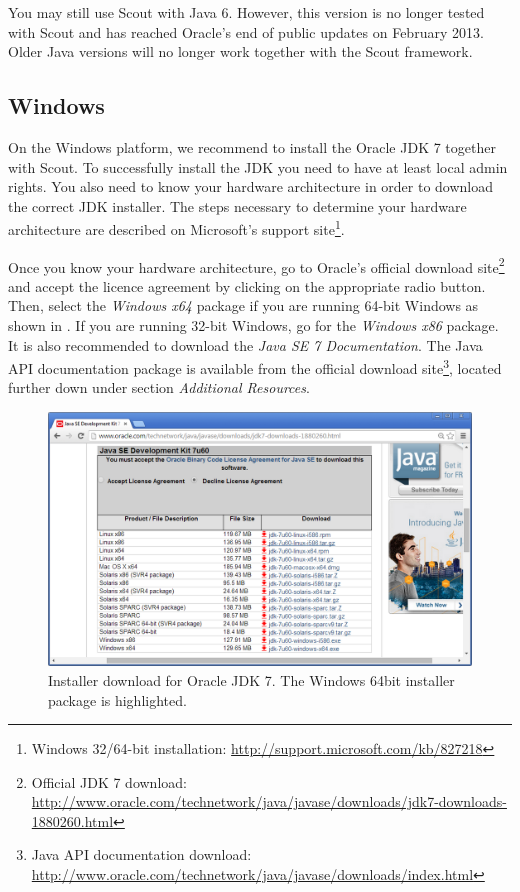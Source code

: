 \documentclass[a4paper,10pt,twoside]{book}
\begin{document}
You may still use Scout with Java 6.
However, this version is no longer tested with Scout and has reached Oracle's end of public updates on February 2013.
Older Java versions will no longer work together with the Scout framework. 

\subsection{Windows}

On the Windows platform, we recommend to install the Oracle JDK 7 together with Scout. 
To successfully install the JDK you need to have at least local admin rights.
You also need to know your hardware architecture in order to download the correct JDK installer. 
The steps necessary to determine your hardware architecture are described on Microsoft's support 
site\footnote{
Windows 32/64-bit installation: \url{http://support.microsoft.com/kb/827218}
}.

Once you know your hardware architecture, go to Oracle's official download 
site\footnote{
Official JDK 7 download: \url{http://www.oracle.com/technetwork/java/javase/downloads/jdk7-downloads-1880260.html}
} 
and accept the licence agreement by clicking on the appropriate radio button.
Then, select the \textit{Windows x64} package if you are running 64-bit Windows as shown in .
If you are running 32-bit Windows, go for the \textit{Windows x86} package.
It is also recommended to download the \textit{Java SE 7 Documentation}.
The Java API documentation package is available from the official download site\footnote{
Java API documentation download: \url{http://www.oracle.com/technetwork/java/javase/downloads/index.html}
}, located further down under section \textit{Additional Resources}.

\begin{figure}
\includegraphics[width=15cm]{oracle_jdk_download.png}
\caption{Installer download for Oracle JDK 7. The Windows 64bit installer package is highlighted.}
\end{figure}
\end{document}
